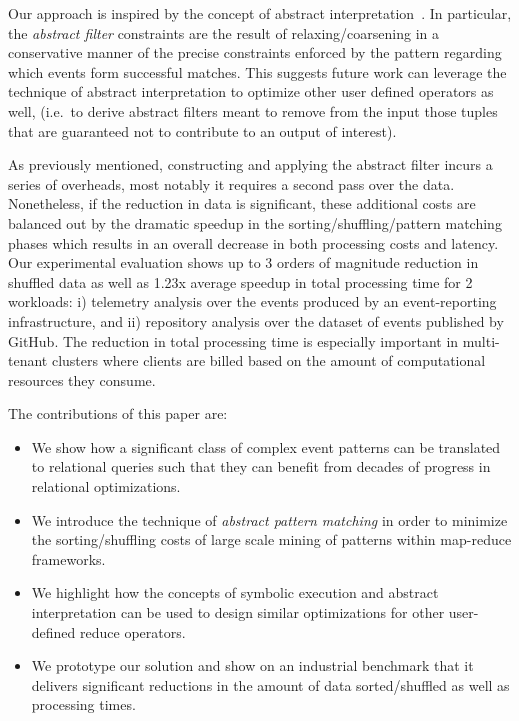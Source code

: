  
Our approach is inspired by the concept of abstract 
interpretation~\cite{Cousot:1977,Graf:1997}.  
In particular, the {\em abstract filter} constraints are the result of
relaxing/coarsening in a conservative manner of the precise constraints enforced
by the pattern regarding which events form successful matches.  This suggests
future work can leverage the technique of abstract interpretation to optimize
other user defined operators as well, (i.e.\ to derive abstract filters meant to
remove from the input those tuples that are guaranteed not to contribute to an
output of interest).


As previously mentioned, constructing and applying the abstract filter incurs a
series of overheads, most notably it requires a second pass over the data.
Nonetheless, if the reduction in data is significant, these additional costs are
balanced out by the dramatic speedup in the sorting/shuffling/pattern matching
phases which results in an overall decrease in both processing costs and
latency.  Our experimental evaluation shows up to 3 orders of magnitude
reduction in shuffled data as well as 1.23x average speedup in total processing
time for 2 workloads: i) telemetry analysis over the events produced by an
event-reporting infrastructure, and ii) repository analysis over the dataset of
events published by GitHub.  The reduction in total processing time is
especially important in multi-tenant clusters where clients are billed based on
the amount of computational resources they consume.

The contributions of this paper are:
\begin{itemize}
	\item We show how a significant class of complex event patterns can be 
	translated to relational queries such that they can benefit from decades of 
	progress in relational optimizations.
	\item We introduce the technique of {\em abstract pattern matching} in 
	order to minimize the sorting/shuffling costs of large scale mining of 
	patterns within map-reduce frameworks.
	\item We highlight how the concepts of symbolic execution and abstract 
	interpretation can be used to design similar optimizations for other 
	user-defined reduce operators.
	\item We prototype our solution and show on an industrial benchmark that 
	it delivers significant reductions in the amount of data sorted/shuffled as 
	well as processing times.  
\end{itemize}



